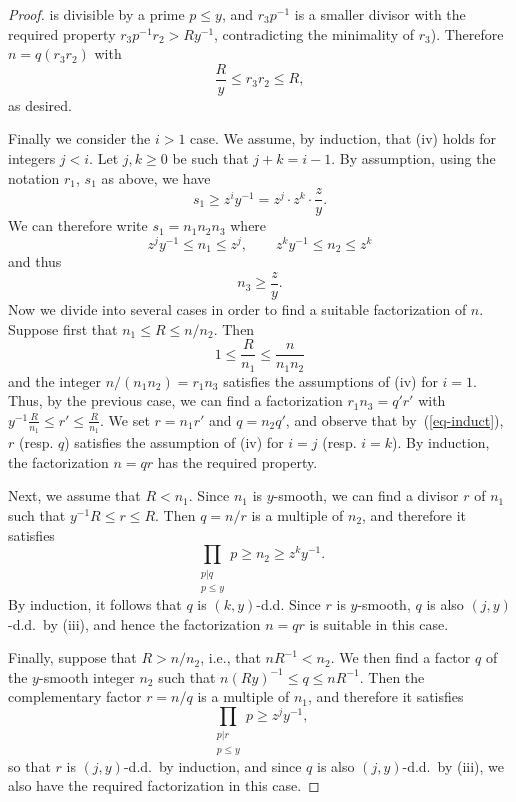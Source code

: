 \documentclass[12pt,a4paper,reqno]{amsart}
\numberwithin{equation}{section}
\theoremstyle{plain}
\theoremstyle{definition}
\begin{document}
\begin{proof}
is divisible by a prime $p\leq y$, and $r_3 p^{-1}$ is a smaller
divisor with the required property $r_3 p^{-1}r_2>Ry^{-1}$, contradicting the minimality of $r_3$). Therefore
$n=q(r_3r_2)$ with 
$$
\frac{R}{y}\leq r_3 r_2\leq R,
$$
as desired.
\par
Finally we consider the $i>1$ case.  We assume, by induction, that
(iv) holds for integers $j<i$. Let $j,k \geq 0$ be such that
$j+k=i-1$.  By assumption, using the notation $r_1$, $s_1$ as above,
we have
$$
s_1\geq z^iy^{-1}=z^j\cdot z^k \cdot \frac{z}{y}.
$$
We can therefore write $s_1=n_1n_2n_3$ where
\begin{equation}\label{eq-induct}
z^j y^{-1} \leq n_1 \leq z^j,\quad\quad
z^k y^{-1} \leq n_2 \leq z^k
\end{equation}
and thus
$$ n_3 \geq \frac{z}{y}.
$$
Now we divide into several cases in order to find a suitable
factorization of $n$.  Suppose first that $n_1 \leq R \leq
n/n_2$. Then 
$$
1 \leq \frac{R}{n_1} \leq \frac{n}{n_1 n_2}
$$ 
and the integer $n/(n_1n_2)=r_1n_3$ satisfies the assumptions of (iv)
for $i=1$. Thus, by the previous case, we can find a factorization
$r_1n_3= q'r'$ with $y^{-1} \frac{R}{n_1} \leq r' \leq
\frac{R}{n_1}$. We set $r = n_1 r'$ and $q = n_2 q'$, and observe that
by~(\ref{eq-induct}), $r$ (resp. $q$) satisfies the assumption of (iv)
for $i=j$ (resp. $i=k$). By induction, the factorization $n=qr$ has
the required property.

Next, we assume that $R < n_1$.  Since $n_1$ is $y$-smooth, we can
find a divisor $r$ of $n_1$ such that $y^{-1} R \leq r \leq R$. Then
$q=n/r$ is a multiple of $n_2$, and therefore it satisfies
$$
\prod_{\substack{p|q\\p \leq y}} p \geq n_2\geq z^k y^{-1}.
$$
By induction, it follows that $q$ is $(k,y)$-d.d. Since $r$ is
$y$-smooth, $q$ is also $(j,y)$-d.d.\ by (iii), and hence the factorization $n=qr$
is suitable in this case.

Finally, suppose that $R > n/n_2$, i.e., that $nR^{-1}<n_2$.  We then
find a factor $q$ of the $y$-smooth integer $n_2$ such that
$n(Ry)^{-1} \leq q \leq nR^{-1}$. Then the complementary factor $r =
n/q$ is a multiple of $n_1$, and therefore it satisfies
$$
\prod_{\substack{p|r\\ p \leq y}} p \geq z^j y^{-1},
$$
so that $r$ is $(j,y)$-d.d.\ by induction, and since $q$ is also $(j,y)$-d.d.\ by
(iii), we also have the required factorization in this case.
\end{proof}


\end{document}
